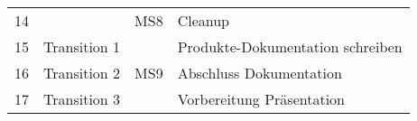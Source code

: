 \begin{table}[H]
\begin{tabular}{| l | l | l | l |}
        14    &                                 & MS8         & Cleanup                                                 \\
        15    & Transition 1                    &             & Produkte-Dokumentation schreiben                        \\
        16    & Transition 2                    & MS9         & Abschluss Dokumentation                                 \\
        17    & Transition 3                    &             & Vorbereitung Präsentation                               \\
        \bottomrule
    \end{tabular}
\end{table}
